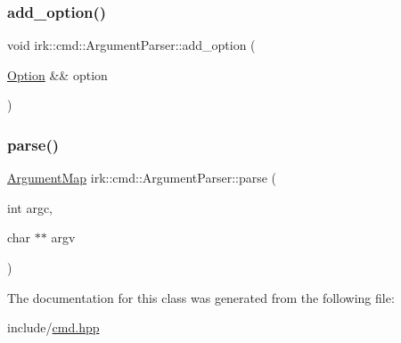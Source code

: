 \subsubsection{\texorpdfstring{add\+\_\+option()}{add\_option()}}
{\footnotesize\ttfamily void irk\+::cmd\+::\+Argument\+Parser\+::add\+\_\+option (\begin{DoxyParamCaption}\item[{\mbox{\hyperlink{classirk_1_1cmd_1_1Option}{Option}} \&\&}]{option }\end{DoxyParamCaption})\hspace{0.3cm}{\ttfamily [inline]}}

\mbox{\label{classirk_1_1cmd_1_1ArgumentParser_aed26f679bf50e0e86789153d6871713f}} 
\subsubsection{\texorpdfstring{parse()}{parse()}}
{\footnotesize\ttfamily \mbox{\hyperlink{classirk_1_1cmd_1_1ArgumentMap}{Argument\+Map}} irk\+::cmd\+::\+Argument\+Parser\+::parse (\begin{DoxyParamCaption}\item[{int}]{argc,  }\item[{char $\ast$$\ast$}]{argv }\end{DoxyParamCaption})\hspace{0.3cm}{\ttfamily [inline]}}



The documentation for this class was generated from the following file\+:\begin{DoxyCompactItemize}
\item 
include/\mbox{\hyperlink{cmd_8hpp}{cmd.\+hpp}}\end{DoxyCompactItemize}
